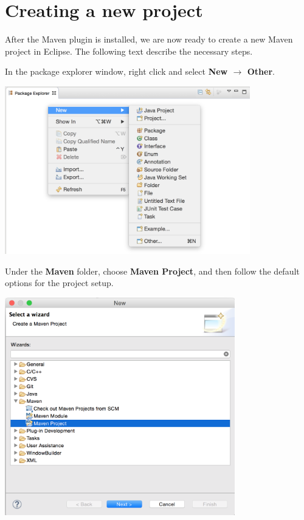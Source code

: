 \section*{Creating a new project}
After the Maven plugin is installed, we are now ready to create a new Maven project in Eclipse. The following text describe the necessary steps. 

In the package explorer window, right click and select {\bf New $\rightarrow$ Other}.
\begin{center}
  \includegraphics[width=0.8\textwidth]{figures/createNewMavenProject1}
\end{center}

Under the {\bf Maven} folder, choose {\bf Maven Project}, and then follow the default options for the project setup.
\begin{center}
  \includegraphics[width=0.75\textwidth]{figures/createNewMavenProject2}
\end{center}

